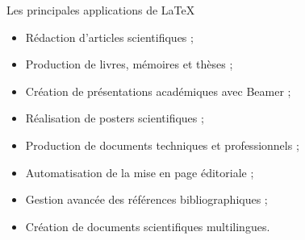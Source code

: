 \documentclass[aspectratio=169]{beamer}
\begin{document}
	\begin{frame}{Les principales applications de \LaTeX{}}
		\begin{itemize}
			\item Rédaction d’articles scientifiques ;
			
			\vspace{0.2cm}
			
			\item Production de livres, mémoires et thèses ;
			
			\vspace{0.2cm}
			
			\item Création de présentations académiques avec Beamer ;
			
			\vspace{0.2cm}
			
			\item Réalisation de posters scientifiques ;
			
			\vspace{0.2cm}
			
			\item Production de documents techniques et professionnels ;
			
			\vspace{0.2cm}
			
			\item Automatisation de la mise en page éditoriale ;
			
			\vspace{0.2cm}
			
			\item Gestion avancée des références bibliographiques ;
			
			\vspace{0.2cm}
			
			\item Création de documents scientifiques multilingues.
		\end{itemize}
	\end{frame}
	
	
\end{document}
